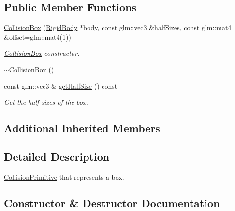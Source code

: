 \subsection*{Public Member Functions}
\begin{DoxyCompactItemize}
\item 
\mbox{\hyperlink{classr3_1_1_collision_box_af20be9fdcddf3a94d195fabf22d8ad3a}{Collision\+Box}} (\mbox{\hyperlink{classr3_1_1_rigid_body}{Rigid\+Body}} $\ast$body, const glm\+::vec3 \&half\+Sizes, const glm\+::mat4 \&offset=glm\+::mat4(1))
\begin{DoxyCompactList}\small\item\em \mbox{\hyperlink{classr3_1_1_collision_box}{Collision\+Box}} constructor. \end{DoxyCompactList}\item 
\mbox{\hyperlink{classr3_1_1_collision_box_aab1d8f1b7999c61cff10b631305cc4f3}{$\sim$\+Collision\+Box}} ()
\item 
const glm\+::vec3 \& \mbox{\hyperlink{classr3_1_1_collision_box_a2410b400cbf9c41839e4684b00a1da04}{get\+Half\+Size}} () const
\begin{DoxyCompactList}\small\item\em Get the half sizes of the box. \end{DoxyCompactList}\end{DoxyCompactItemize}
\subsection*{Additional Inherited Members}


\subsection{Detailed Description}
\mbox{\hyperlink{classr3_1_1_collision_primitive}{Collision\+Primitive}} that represents a box. 

\subsection{Constructor \& Destructor Documentation}
\mbox{\label{classr3_1_1_collision_box_af20be9fdcddf3a94d195fabf22d8ad3a}} 
